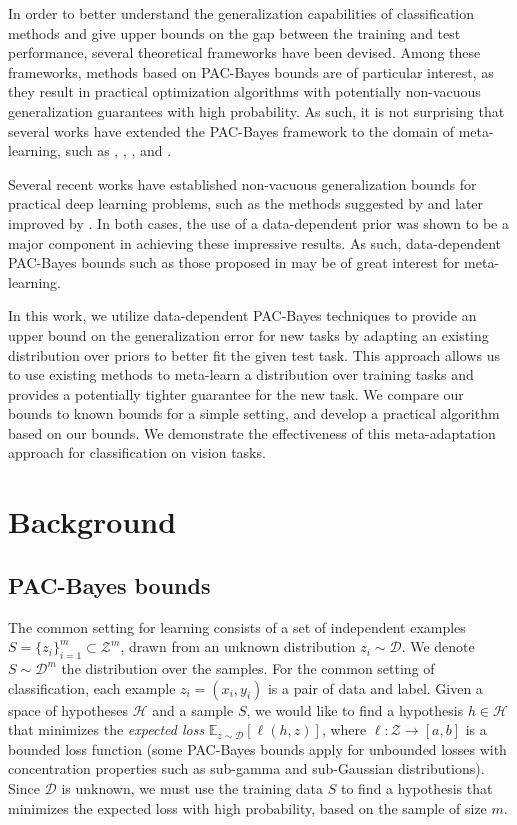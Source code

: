 \documentclass[letterpaper]{article} %
\theoremstyle{definition}
\newcommand{\Expect}[2]{\mathbb{E}_{#1}\left [#2 \right ]}
\begin{document}
In order to better understand the generalization capabilities of classification methods and give upper bounds on the gap between the training and test performance, several theoretical frameworks have been devised.  Among these frameworks, methods based on PAC-Bayes bounds \citep{Mcallester} are of particular interest, as they result in practical optimization algorithms with potentially non-vacuous generalization guarantees with high probability. As such, it is not surprising that several works have extended the PAC-Bayes framework to the domain of meta-learning, such as \citet{Pentina2014}, \citet{Amit2018}, \citet{Rothfuss2020}, \citet{Liu2021} and \citet{Farid2021}.

Several recent works have established non-vacuous generalization bounds for practical deep learning problems, such as the methods suggested by \citet{Dziugaite2017} and later improved by \citet{Perez-Ortiz2021}. In both cases, the use of a data-dependent prior was shown to be a major component in achieving these impressive results. As such, data-dependent PAC-Bayes bounds such as those proposed in \citet{Rivasplata2020} may be of great interest for meta-learning.

In this work, we utilize data-dependent PAC-Bayes techniques to provide an upper bound on the generalization error for new tasks by adapting an existing distribution over priors to better fit the given test task. This approach allows us to use existing methods to meta-learn a distribution over training tasks and provides a potentially tighter guarantee for the new task.
We compare our bounds to known bounds for a simple setting, and develop a practical algorithm based on our bounds. We demonstrate the effectiveness of this meta-adaptation approach for classification on vision tasks.

\section{Background}

\subsection{PAC-Bayes bounds}

The common setting for learning consists of a set of independent examples $S=\{z_i\}_{i=1}^{m}\subset \mathcal{Z}^m$, drawn from an unknown distribution $z_i\sim \mathcal{D}$. We denote $S\sim \mathcal{D}^m$ the distribution over the samples. 
For the common setting of classification, each example $z_i=(x_i,y_i)$ is a pair of data and label.
Given a space of hypotheses $\mathcal{H}$ and a sample $S$, we would like to find a hypothesis $h\in \mathcal{H}$ that minimizes the \emph{expected loss} $\Expect{z\sim \mathcal{D}}{\ell(h,z)}$, where $\ell:\mathcal{Z}\rightarrow [a,b]$ is a bounded loss function (some PAC-Bayes bounds apply for unbounded losses with concentration properties such as sub-gamma and sub-Gaussian distributions).
Since $\mathcal{D}$ is unknown, we must use the training data $S$ to find a hypothesis that minimizes the expected loss with high probability, based on the sample of size $m$.
\end{document}
